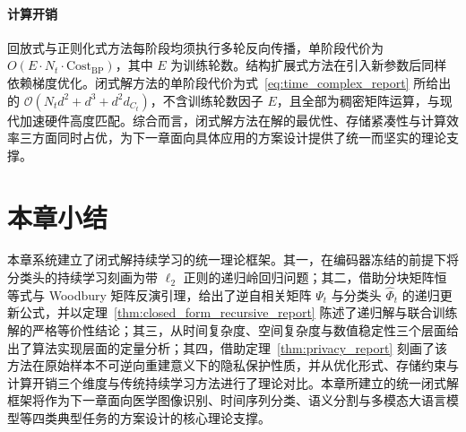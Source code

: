 \paragraph{计算开销} 回放式与正则化式方法每阶段均须执行多轮反向传播，单阶段代价为 $O(E\cdot N_t \cdot \mathrm{Cost}_{\mathrm{BP}})$，其中 $E$ 为训练轮数。结构扩展式方法在引入新参数后同样依赖梯度优化。闭式解方法的单阶段代价为式~\eqref{eq:time_complex_report} 所给出的 $\mathcal{O}(N_t d^2 + d^3 + d^2 d_{C_t})$，不含训练轮数因子 $E$，且全部为稠密矩阵运算，与现代加速硬件高度匹配。综合而言，闭式解方法在解的最优性、存储紧凑性与计算效率三方面同时占优，为下一章面向具体应用的方案设计提供了统一而坚实的理论支撑。

\section{本章小结}

本章系统建立了闭式解持续学习的统一理论框架。其一，在编码器冻结的前提下将分类头的持续学习刻画为带 $\ell_2$ 正则的递归岭回归问题；其二，借助分块矩阵恒等式与 Woodbury 矩阵反演引理，给出了逆自相关矩阵 $\Psi_t$ 与分类头 $\widehat{\Phi}_t$ 的递归更新公式，并以定理~\ref{thm:closed_form_recursive_report} 陈述了递归解与联合训练解的严格等价性结论；其三，从时间复杂度、空间复杂度与数值稳定性三个层面给出了算法实现层面的定量分析；其四，借助定理~\ref{thm:privacy_report} 刻画了该方法在原始样本不可逆向重建意义下的隐私保护性质，并从优化形式、存储约束与计算开销三个维度与传统持续学习方法进行了理论对比。本章所建立的统一闭式解框架将作为下一章面向医学图像识别、时间序列分类、语义分割与多模态大语言模型等四类典型任务的方案设计的核心理论支撑。

